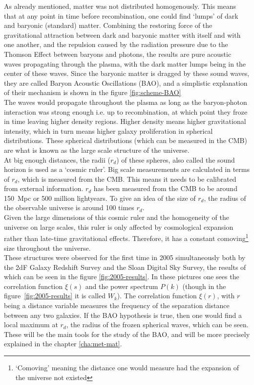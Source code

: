 As already mentioned, matter was not distributed homogenously. This means that at any point in time before recombination, one could find `lumps' of dark and baryonic (standard) matter. Combining the restoring force of the gravitational attraction between dark and baryonic matter with itself and with one another, and the repulsion caused by the radiation pressure due to the Thomson Effect between baryons and photons, the results are pure acoustic waves propagating through the plasma, with the dark matter lumps being in the center of these waves. Since the baryonic matter is dragged by these sound waves, they are called Baryon Acoustic Oscillations (BAO), and a simplistic explanation of their mechanism is shown in the figure \ref{fig:scheme-BAO} \\


The waves would propagate throughout the plasma as long as the baryon-photon interaction was strong enough i.e. up to recombination, at which point they froze in time leaving higher density regions. Higher density means higher gravitational intensity, which in turn means higher galaxy proliferation in spherical distributions. These spherical distributions (which can be measured in the CMB) are what is known as the large scale structure of the universe. \\

At big enough distances, the radii ($r_d$) of these spheres, also called the sound horizon is used as a `cosmic ruler'. Big scale measurements are calculated in terms of $r_d$, which is measured from the CMB. This means it needs to be calibrated from external information. $ r_d$ has been measured from the CMB to be around  \SI{150}{Mpc} or 500 million lightyears.
To give an idea of the size of $r_d$, the radius of the observable universe is around 100 times $r_d$. \\

Given the large dimensions of this cosmic ruler and the homogeneity of the universe on large scales, this ruler is only affected by cosmological expansion rather than late-time gravitational effects. Therefore, it has a constant comoving\footnote{`Comoving' meaning the distance one would measure had the expansion of the universe not existed} size throughout the universe.\\

These structures were observed for the first time in 2005 simultaneously both by the 2dF Galaxy Redshift Survey\cite{2dFCole2005} and the Sloan Digital Sky Survey\cite{Eisenstein2005}, the results of which can be seen in the figure \ref{fig:2005-results}. In these pictures one sees the correlation function  $\xi(s)$ and the power spectrum $P(k)$ (though in the figure~\ref{fig:2005-results} it is called $W_k$). 
The correlation function $\xi(r)$, with $r$ being a distance variable measures the frequency of the separation distance between any two galaxies. If the BAO hypothesis is true, then one would find a local maximum at $r_d$, the radius of the frozen spherical waves, which can be seen. These will be the main tools for the study of the BAO, and will be more precisely explained in the chapter \ref{cha:met-mat}.\\


